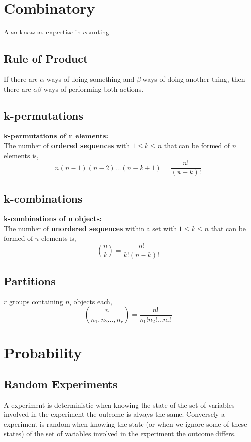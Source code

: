 \section{Combinatory}
Also know as expertise in counting

\subsection{Rule of Product}
If there are $\alpha$ ways of doing something and $\beta$ ways of doing another thing, then there are $\alpha\beta$ ways of performing both actions.

\subsection{k-permutations}
\textbf{k-permutations of n elements:}\\
The number of \textbf{ordered sequences} with $1\leq k \leq n$ that can be formed of $n$ elements is,
\[ n(n-1)(n-2)\dots(n-k+1) = \frac{n!}{(n-k)!} \]

\subsection{k-combinations}
\textbf{k-combinations of n objects:}\\
The number of \textbf{unordered sequences} within a set with $1\leq k \leq n$ that can be formed of $n$ elements is,
\[ \binom{n}{k} = \frac{n!}{k!(n-k)!} \]

\subsection{Partitions}
$r$ groups containing $n_i$ objects each,
\[ \binom{n}{n_1,n_2\dots,n_r} = \frac{n!}{n_1!n_2!\dots n_r!} \]

\section{Probability}

\subsection{Random Experiments}
 A experiment is deterministic when knowing the state of the set of variables involved in the experiment the outcome is always the same.
 Conversely a experiment is random when knowing the state (or when we ignore some of these states) of the set of variables involved in
 the experiment the outcome differs. \\
 
